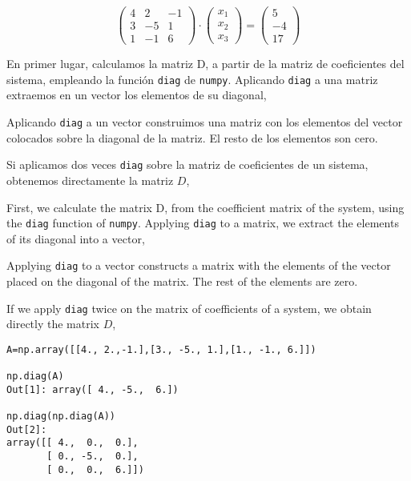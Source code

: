 \begin{equation*}
\begin{pmatrix}
4& 2& -1\\
3& -5& 1\\
1& -1& 6
\end{pmatrix}\cdot \begin{pmatrix}
x_1\\
x_2\\
x_3
\end{pmatrix}=\begin{pmatrix}
5\\
-4\\
17
\end{pmatrix}
\end{equation*}

\begin{paracol}{2}
En primer lugar, calculamos la matriz D, a partir de la matriz de coeficientes del sistema, empleando la función \texttt{diag} de \texttt{numpy}. Aplicando \texttt{diag} a una matriz extraemos en un vector los elementos de su diagonal, 

Aplicando \texttt{diag} a un vector construimos una matriz con los elementos del vector colocados sobre la diagonal de la matriz. El resto de los elementos son cero.

Si aplicamos dos veces \texttt{diag} sobre la matriz de coeficientes de un sistema, obtenemos directamente la matriz $D$,

\switchcolumn
First, we calculate the matrix D, from the coefficient matrix of the system, using the \texttt{diag} function of \texttt{numpy}. Applying \texttt{diag} to a matrix, we extract the elements of its diagonal into a vector, 

Applying \texttt{diag} to a vector constructs a matrix with the elements of the vector placed on the diagonal of the matrix. The rest of the elements are zero.

If we apply \texttt{diag} twice on the matrix of coefficients of a system, we obtain directly the matrix $D$,
\end{paracol}

\begin{verbatim}
A=np.array([[4., 2.,-1.],[3., -5., 1.],[1., -1., 6.]])

np.diag(A)
Out[1]: array([ 4., -5.,  6.])

np.diag(np.diag(A))
Out[2]: 
array([[ 4.,  0.,  0.],
       [ 0., -5.,  0.],
       [ 0.,  0.,  6.]])
\end{verbatim}

